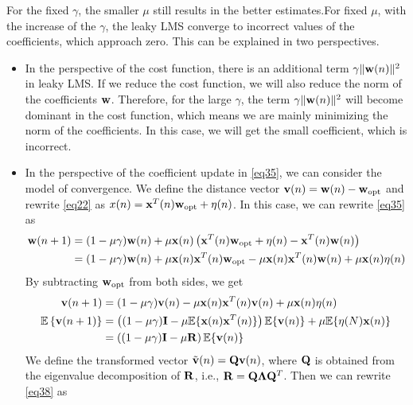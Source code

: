 \documentclass[10pt]{article}
\begin{document}
For the fixed $\gamma$, the smaller $\mu$ still results in the 
better estimates.For fixed $\mu$, with the increase of the $\gamma$, the leaky LMS converge to
incorrect values of the coefficients, which approach zero. This can be explained in two perspectives.
\begin{itemize}
	\item In the perspective of the cost function, there is an additional term $\gamma \Vert {\bf{w}}(n) \Vert^2$
	in leaky LMS. If we reduce the cost function, we will also reduce the norm of the coefficients ${\bf{w}}$.
	Therefore, for the large $\gamma$, the term $\gamma \Vert {\bf{w}}(n) \Vert^2$ will become dominant in the cost
	function, which means we are mainly minimizing the norm of the coefficients. In this case, we will get the small
	coefficient, which is incorrect.
	\item In the perspective of the coefficient update in \eqref{eq35}, we can consider the model of convergence. 
	We define the distance vector ${\bf{v}}(n) = {\bf{w}}(n) - {\bf{w}}_{\text{opt}}$ and rewrite \eqref{eq22} as
	$x(n) = {\bf{x}}^T(n) {\bf{w}}_{\text{opt}} + \eta(n)$. In this case, we can rewrite \eqref{eq35} as
	\begin{align}
		{\bf{w}}(n+1) & = (1-\mu \gamma) {\bf{w}}(n) + \mu {\bf{x}}(n) \left( {\bf{x}}^T(n) {\bf{w}}_{\text{opt}} + \eta(n) - {\bf{x}}^T(n) {\bf{w}}(n) \right) \nonumber \\
		& = (1-\mu \gamma) {\bf{w}}(n) + \mu {\bf{x}}(n) {\bf{x}}^T(n) {\bf{w}}_{\text{opt}} - \mu {\bf{x}}(n) {\bf{x}}^T(n) {\bf{w}}(n) + \mu {\bf{x}}(n) \eta(n)
	\end{align}
	By subtracting ${\bf{w}}_{\text{opt}}$ from both sides, we get 
	\begin{align}
		{\bf{v}}(n+1) & = (1-\mu \gamma) {\bf{v}}(n) - \mu {\bf{x}}(n) {\bf{x}}^T(n) {\bf{v}}(n) + \mu {\bf{x}}(n) \eta(n) \\
		\mathbb{E} \left\{ {\bf{v}}(n+1) \right\} &= \left( (1-\mu \gamma) {\bf{I}} - \mu \mathbb{E}\{{\bf{x}}(n) {\bf{x}}^T(n)\} \right) \mathbb{E} \{ {\bf{v}}(n) \} + \mu \mathbb{E}\{ \eta(N) {\bf{x}}(n) \} \nonumber \\
		& =  \left( (1-\mu \gamma) {\bf{I}} - \mu {\bf{R}} \right) \mathbb{E} \{ {\bf{v}}(n) \} \label{eq38}
	\end{align}
	We define the transformed vector $\tilde{\bf{v}}(n) = {\bf{Q}} {\bf{v}}(n)$, where $\bf{Q}$ is obtained from the eigenvalue decomposition of
	${\bf{R}}$, i.e., ${\bf{R}} = {\bf{Q}} {\bf{\Lambda}} {\bf{Q}}^T$. Then we can rewrite \eqref{eq38} as

\end{itemize}
\end{document}
